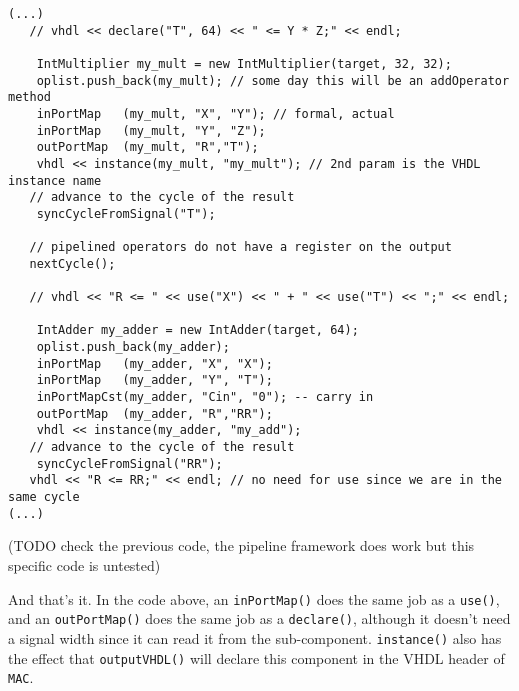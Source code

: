 \documentclass{article}
\begin{document}
\begin{verbatim}
(...)
   // vhdl << declare("T", 64) << " <= Y * Z;" << endl;

	IntMultiplier my_mult = new IntMultiplier(target, 32, 32);
	oplist.push_back(my_mult); // some day this will be an addOperator method
	inPortMap   (my_mult, "X", "Y"); // formal, actual
	inPortMap   (my_mult, "Y", "Z");
	outPortMap  (my_mult, "R","T");
	vhdl << instance(my_mult, "my_mult"); // 2nd param is the VHDL instance name
   // advance to the cycle of the result
	syncCycleFromSignal("T"); 

   // pipelined operators do not have a register on the output 
   nextCycle();

   // vhdl << "R <= " << use("X") << " + " << use("T") << ";" << endl;

	IntAdder my_adder = new IntAdder(target, 64);
	oplist.push_back(my_adder);
	inPortMap   (my_adder, "X", "X");
	inPortMap   (my_adder, "Y", "T");
	inPortMapCst(my_adder, "Cin", "0"); -- carry in
	outPortMap  (my_adder, "R","RR");
	vhdl << instance(my_adder, "my_add");
   // advance to the cycle of the result
	syncCycleFromSignal("RR"); 
   vhdl << "R <= RR;" << endl; // no need for use since we are in the same cycle
(...)
\end{verbatim}

(TODO check the previous code, the pipeline framework does work but this specific code is untested)

And that's it. In the code above, an \verb!inPortMap()! does the same
job as a \verb!use()!, and an \verb!outPortMap()! does the same job as
a \verb!declare()!, although it doesn't need a signal width since it
can read it from the sub-component. \verb!instance()! also has the
effect that \verb!outputVHDL()! will declare this component in the
VHDL header of \verb!MAC!.
\end{document}

